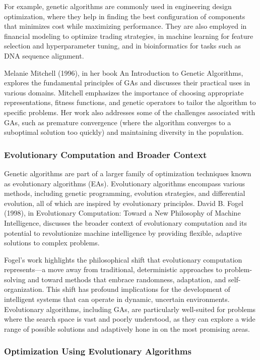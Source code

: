 \documentclass[12pt,twoside]{article}
\begin{document}
For example, genetic algorithms are commonly used in engineering design optimization, where they help in finding the best configuration of components that minimizes cost while maximizing performance. They are also employed in financial modeling to optimize trading strategies, in machine learning for feature selection and hyperparameter tuning, and in bioinformatics for tasks such as DNA sequence alignment.

Melanie Mitchell (1996), in her book An Introduction to Genetic Algorithms, explores the fundamental principles of GAs and discusses their practical uses in various domains. Mitchell emphasizes the importance of choosing appropriate representations, fitness functions, and genetic operators to tailor the algorithm to specific problems. Her work also addresses some of the challenges associated with GAs, such as premature convergence (where the algorithm converges to a suboptimal solution too quickly) and maintaining diversity in the population.

\subsubsection{Evolutionary Computation and Broader Context}

Genetic algorithms are part of a larger family of optimization techniques known as evolutionary algorithms (EAs). Evolutionary algorithms encompass various methods, including genetic programming, evolution strategies, and differential evolution, all of which are inspired by evolutionary principles. David B. Fogel (1998), in Evolutionary Computation: Toward a New Philosophy of Machine Intelligence, discusses the broader context of evolutionary computation and its potential to revolutionize machine intelligence by providing flexible, adaptive solutions to complex problems.

Fogel’s work highlights the philosophical shift that evolutionary computation represents—a move away from traditional, deterministic approaches to problem-solving and toward methods that embrace randomness, adaptation, and self-organization. This shift has profound implications for the development of intelligent systems that can operate in dynamic, uncertain environments. Evolutionary algorithms, including GAs, are particularly well-suited for problems where the search space is vast and poorly understood, as they can explore a wide range of possible solutions and adaptively hone in on the most promising areas.

\subsubsection{Optimization Using Evolutionary Algorithms}
\end{document}
